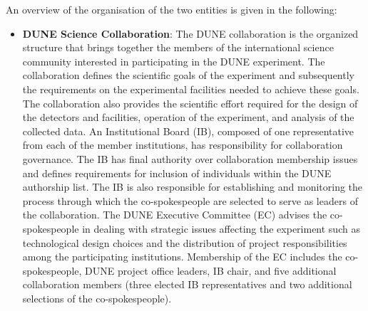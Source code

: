 An overview of the organisation of the two entities is given in the following:
\begin{itemize}
\item {\bf DUNE Science Collaboration}: 
The DUNE collaboration is the organized structure that brings together the members of the international science community interested in participating in the DUNE experiment.  The collaboration defines the scientific goals of the experiment and subsequently the requirements on the experimental facilities needed to achieve these goals.  The collaboration also provides the scientific effort required for the design of the detectors and facilities, operation of the experiment, and analysis of the collected data.  An Institutional Board (IB), composed of one representative from each of the member institutions, has responsibility for collaboration governance.  The IB has final authority over collaboration membership issues and defines requirements for inclusion of individuals within the DUNE authorship list. The IB is also responsible for establishing and monitoring the process through which the co-spokespeople          are selected to serve as leaders of the collaboration.   The DUNE Executive Committee (EC) advises the co-spokespeople in dealing with strategic issues affecting the experiment such as technological design choices and the distribution of project responsibilities among the participating institutions.  Membership of the EC includes the co-spokespeople, DUNE project office leaders, IB chair, and five additional collaboration members (three elected IB representatives and two additional selections of the co-spokespeople).


\end{itemize}

